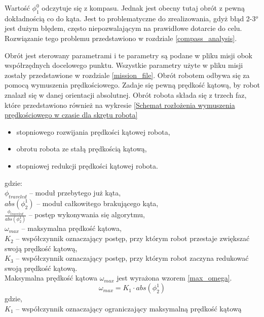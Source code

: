 {{        Wartość $\phi_1^0$ odczytuje się z kompasu. Jednak jest obecny tutaj obrót z pewną dokładnością co do kąta. Jest to problematyczne do zrealizowania, gdyż błąd 2-3$^o$ jest dużym błędem, często niepozwalającym na prawidłowe dotarcie do celu. Rozwiązanie tego problemu przedstawiono w rozdziale \ref{compass_analysis}.

        Obrót jest sterowany parametrami i te parametry są podane w pliku misji obok współrzędnych docelowego punktu. Wszystkie parametry użyte w pliku misji zostały przedstawione w rozdziale \ref{mission_file}. 
        Obrót robotem odbywa się za pomocą wymuszenia prędkościowego. Zadaje się pewną prędkość kątową, by robot znalazł się w danej orientacji absolutnej. 
        Obrót robota składa się z trzech faz, które przedstawiono również na wykresie \ref{Schemat rozłożenia wymuszenia prędkościowego w czasie dla skrętu robota}

        \begin{itemize}
            \item stopniowego rozwijania prędkości kątowej robota,
            \item obrotu robota ze stałą prędkością kątową,
            \item stopniowej redukcji prędkości kątowej robota.
        \end{itemize}

        gdzie:\\
        $\phi_{traveled}$ -- moduł przebytego już kąta,\\
        $abs(\phi_2^1)$ -- moduł całkowitego brakującego kąta,\\
        $\frac{\phi_{traveled}}{abs(\phi_2^1)}$ -- postęp wykonywania się algorytmu,\\
        $\omega_{max}$ -- maksymalna prędkość kątowa,\\
        $K_2$ -- współczynnik oznaczający postęp, przy którym robot przestaje zwiększać swoją prędkość kątową,\\
        $K_3$ -- współczynnik oznaczający postęp, przy którym robot zaczyna redukować swoją prędkość kątową.\\

        Maksymalna prędkość kątowa $\omega_{max}$ jest wyrażona wzorem \ref{max_omega}.
        \begin{equation}\label{max_omega}
            \omega_{max}=K_1 \cdot abs(\phi_2^1)
        \end{equation}
        gdzie,\\
        $K_1$ -- współczynnik oznaczający ograniczający maksymalną prędkość kątową\\
        
}}

